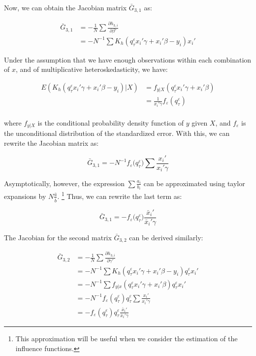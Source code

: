 \documentclass[
  authoryear,
  preprint,
  1p]{elsarticle}
\begin{document}
Now, we can obtain the Jacobian matrix \(\bar G_{3,1}\) as:

\[\begin{aligned}
\bar G_{3,1} &= -\frac{1}{N} \sum \frac{\partial h_{3,i}}{\partial \beta'} \\
             &= -N^{-1} \sum K_h(q^\varepsilon_\tau x_i'\gamma +x_i'\beta - y_i ) x_i'
\end{aligned}
\]

Under the assumption that we have enough observations within each
combination of \(x\), and of multiplicative heteroskedasticity, we have:

\[\begin{aligned}
E(K_h(q^\varepsilon_\tau x_i'\gamma +x_i'\beta - y_i )|X) &= f_{y|X}(q^\varepsilon_\tau x_i'\gamma +x_i'\beta) \\
&=\frac{1}{x_i'\gamma} f_{\varepsilon}(q^\varepsilon_\tau) \\
\end{aligned}
\]

where \(f_{y|X}\) is the conditional probability density function of
\(y\) given \(X\), and \(f_\varepsilon\) is the unconditional
distribution of the standardized error. With this, we can rewrite the
Jacobian matrix as:

\[\bar G_{3,1} = -N^{-1} f_{\varepsilon}\big(q^\varepsilon_\tau\big) \sum  \frac{x_i'}{x_i'\gamma} 
\]

Asymptotically, however, the expression \(\sum\frac{a_i}{b_i}\) can be
approximated using taylor expansions by \(N\frac{\bar a}{\bar b}\).
\footnote{This approximation will be useful when we consider the
  estimation of the influence functions.} Thus, we can rewrite the last
term as:

\[\bar G_{3,1} = - f_{\varepsilon}\big(q^\varepsilon_\tau\big) \frac{\bar x_i'}{\bar x_i'\gamma} 
\]

The Jacobian for the second matrix \(\bar G_{3,2}\) can be derived
similarly:

\[\begin{aligned}
\bar G_{3,2} &= -\frac{1}{N} \sum \frac{\partial h_{3,i}}{\partial \gamma'} \\
             &= -N^{-1} \sum K_h(q^\varepsilon_\tau x_i'\gamma +x_i'\beta - y_i ) q^\varepsilon_\tau x_i' \\
             &=-N^{-1} \sum f_{y|x}(q^\varepsilon_\tau x_i'\gamma +x_i'\beta ) q^\varepsilon_\tau x_i' \\
             &=-N^{-1} f_{\varepsilon}(q^\varepsilon_\tau) q^\varepsilon_\tau \sum \frac{x_i'}{x_i'\gamma} \\
             &=- f_{\varepsilon}(q^\varepsilon_\tau) q^\varepsilon_\tau \frac{\bar x_i'}{\bar x_i'\gamma}
\end{aligned}
\]
\end{document}
